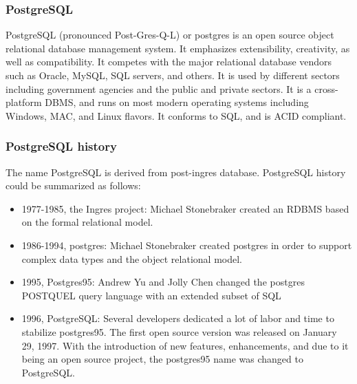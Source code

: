 \subsubsection*{PostgreSQL}
PostgreSQL (pronounced Post-Gres-Q-L) or postgres is an open source object relational database management system. It emphasizes extensibility, creativity, as well as compatibility. It competes with the major relational database vendors such as Oracle, MySQL, SQL servers, and others. It is used by different sectors including government agencies and the public and private sectors. It is a cross-platform DBMS, and runs on most modern operating systems including Windows, MAC, and Linux flavors. It conforms to SQL, and is ACID compliant.

\subsubsection*{PostgreSQL history}
The name PostgreSQL is derived from post-ingres database. PostgreSQL history could be summarized as follows:
\begin{itemize}
	\item 1977-1985, the Ingres project: Michael Stonebraker created an RDBMS based on the formal relational model.
	\item 1986-1994, postgres: Michael Stonebraker created postgres in order to support complex data types and the object relational model.
	\item 1995, Postgres95: Andrew Yu and Jolly Chen changed the postgres POSTQUEL query language with an extended subset of SQL
	\item 1996, PostgreSQL: Several developers dedicated a lot of labor and time to stabilize postgres95. The first open source version was released on January 29, 1997. With the introduction of new features, enhancements, and due to it being an open source project, the postgres95 name was changed to PostgreSQL.
\end{itemize}


